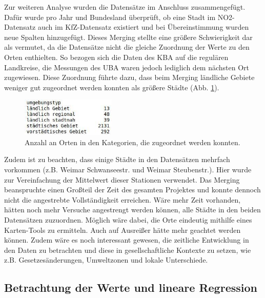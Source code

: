 \documentclass[11pt,a4paper,oneside,german]{article}
\begin{document}
	Zur weiteren Analyse wurden die Datensätze im Anschluss zusammengefügt. Dafür wurde pro Jahr und Bundesland überprüft, ob eine Stadt im NO2-Datensatz auch im KfZ-Datensatz existiert und bei Übereinstimmung wurden neue Spalten hinzugefügt. Dieses Merging stellte eine größere Schwierigkeit dar als vermutet, da die Datensätze nicht die gleiche Zuordnung der Werte zu den Orten enthielten. So bezogen sich die Daten des KBA auf die regulären Landkreise, die Messungen des UBA waren jedoch lediglich dem nächsten Ort zugewiesen. Diese Zuordnung führte dazu, dass beim Merging ländliche Gebiete weniger gut zugeordnet werden konnten als größere Städte (Abb. \ref{fig:Kategorien}).\\
	
	\begin{figure}
		\vspace{-20pt}
		\begin{center}
			\includegraphics[width=4.5cm]{Kategorien.jpg}
			\caption{Anzahl an Orten in den Kategorien, die zugeordnet werden konnten.}
			\label{fig:Kategorien}
		\end{center}
		\vspace{-20pt}
	\end{figure}
	
	Zudem ist zu beachten, dass einige Städte in den Datensätzen mehrfach vorkommen (z.B. Weimar Schwanseestr. und Weimar Steubenstr.). Hier wurde zur Vereinfachung der Mittelwert dieser Stationen verwendet. Das Merging beanspruchte einen Großteil der Zeit des gesamten Projektes und konnte dennoch nicht die angestrebte Vollständigkeit erreichen. Wäre mehr Zeit vorhanden, hätten noch mehr Versuche angestrengt werden können, alle Städte in den beiden Datensätzen zuzuordnen. Möglich wäre dabei, die Orte eindeutig mithilfe eines Karten-Tools zu ermitteln. Auch auf Ausreißer hätte mehr geachtet werden können. Zudem wäre es noch interessant gewesen, die zeitliche Entwicklung in den Daten zu betrachten und diese in gesellschaftliche Kontexte zu setzen, wie z.B. Gesetzesänderungen, Umweltzonen und lokale Unterschiede.
	
	\subsection{Betrachtung der Werte und lineare Regression}
	
\end{document}

